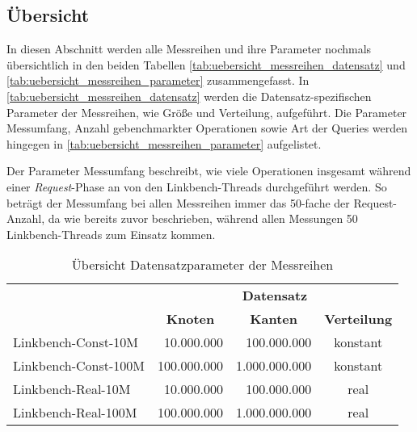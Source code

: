 \subsection{Übersicht}
In diesen Abschnitt werden alle Messreihen und ihre Parameter nochmals übersichtlich in den beiden Tabellen \autoref{tab:uebersicht_messreihen_datensatz} und \autoref{tab:uebersicht_messreihen_parameter} zusammengefasst. In \autoref{tab:uebersicht_messreihen_datensatz} werden die Datensatz-spezifischen Parameter der Messreihen, wie Größe und Verteilung, aufgeführt. Die Parameter Messumfang, Anzahl gebenchmarkter Operationen sowie Art der Queries werden hingegen in \autoref{tab:uebersicht_messreihen_parameter} aufgelistet.

Der Parameter Messumfang beschreibt, wie viele Operationen insgesamt während einer \textit{Request}-Phase an von den Linkbench-Threads durchgeführt werden. So beträgt der Messumfang bei allen Messreihen immer das 50-fache der Request-Anzahl, da wie bereits zuvor beschrieben, während allen Messungen 50 Linkbench-Threads zum Einsatz kommen. 

\begin{table}[!ht]
    \centering
    \begin{tabular}{l|r|r|c}
    \hline
    \rowcolor[HTML]{EFEFEF} 
    \multicolumn{1}{c|}{\cellcolor[HTML]{EFEFEF}{\color[HTML]{333333} }} & \multicolumn{3}{c}{\cellcolor[HTML]{EFEFEF}\textbf{Datensatz}} \\ \cline{2-4} 
    \rowcolor[HTML]{EFEFEF} 
    \multicolumn{1}{c|}{\multirow{-2}{*}{\cellcolor[HTML]{EFEFEF}{\color[HTML]{333333} \textbf{Messreihe}}}} & \multicolumn{1}{c|}{\cellcolor[HTML]{EFEFEF}\textbf{Knoten}} & \multicolumn{1}{c|}{\cellcolor[HTML]{EFEFEF}\textbf{Kanten}} & \multicolumn{1}{l}{\cellcolor[HTML]{EFEFEF}\textbf{Verteilung}} \\ \hline
    Linkbench-Const-10M & 10.000.000 & 100.000.000 & konstant \\
    Linkbench-Const-100M & 100.000.000 & 1.000.000.000 & konstant \\
    Linkbench-Real-10M & 10.000.000 & 100.000.000 & real \\
    Linkbench-Real-100M & 100.000.000 & 1.000.000.000 & real \\ \hline
    \end{tabular}
    \caption{Übersicht Datensatzparameter der Messreihen}
    \label{tab:uebersicht_messreihen_datensatz}
\end{table}

